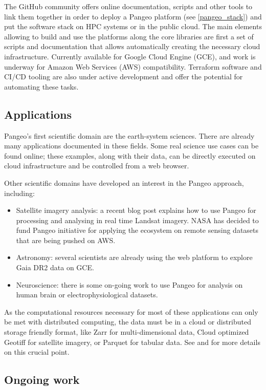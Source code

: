 \documentclass{article}
\begin{document}
The GitHub community offers online documentation, scripts and other tools to link them together in order to deploy a Pangeo platform (see \ref{pangeo_stack}) and put the software stack on HPC systems or in the public cloud. The main elements allowing to build and use the platforms along the core libraries are first a set of scripts and documentation that allows automatically creating the necessary cloud infrastructure. Currently available for Google Cloud Engine (GCE), and work is underway for Amazon Web Services (AWS) compatibility. Terraform software and CI/CD tooling are also under active development and offer the potential for automating these tasks.


\subsection{Applications}
\label{ssec:applications}

Pangeo's first scientific domain are the earth-system sciences. There are already many applications documented in these fields. Some real science use cases can be found online\cite{b5}; these examples, along with their data, can be directly executed on cloud infrastructure and be controlled from a web browser.

Other scientific domains have developed an interest in the Pangeo approach, including:
\begin{itemize}
\item Satellite imagery analysis: a recent blog post\cite{b6} explains how to use Pangeo for processing and analysing in real time Landsat imagery. NASA has decided to fund Pangeo initiative for applying the ecosystem on remote sensing datasets that are being pushed on AWS\cite{b10}.
\item Astronomy: several scientists are already using the web platform to explore Gaia DR2 data on GCE.
\item Neuroscience: there is some on-going work to use Pangeo for analysis on human brain or electrophysiological datasets.
\end{itemize}

As the computational resources necessary for most of these applications can only
be met with distributed computing, the data must be in a cloud or distributed
storage friendly format, like Zarr for multi-dimensional data, Cloud optimized
Geotiff for satellite imagery, or Parquet for tabular data. See \cite{b7} and
\cite{b11} for more details on this crucial point.

\subsection{Ongoing work}
\label{ssec:ongowork}
\end{document}
